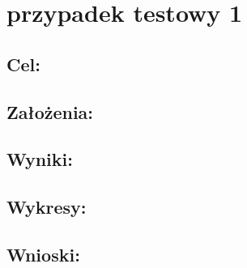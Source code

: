 \section{przypadek testowy 1}
\subsection{Cel: }
\subsection{Założenia: }
\subsection{Wyniki: }
\subsection{Wykresy: }
\subsection{Wnioski: }

